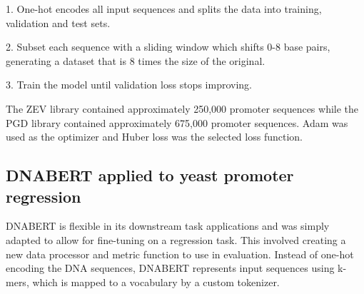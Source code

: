 \documentclass{article}
\begin{document}
1. One-hot encodes all input sequences and splits the data into training, validation and test sets.

2. Subset each sequence with a sliding window which shifts 0-8 base pairs, generating a dataset that is 8 times the size of the original.

3. Train the model until validation loss stops improving.

The ZEV library contained approximately 250,000 promoter sequences while the PGD library contained approximately 675,000 promoter sequences. Adam was used as the optimizer and Huber loss was the selected loss function. 

\subsection{DNABERT applied to yeast promoter regression}
DNABERT is flexible in its downstream task applications and was simply adapted to allow for fine-tuning on a regression task. This involved creating a new data processor and metric function to use in evaluation. Instead of one-hot encoding the DNA sequences, DNABERT represents input sequences using k-mers, which is mapped to a vocabulary by a custom tokenizer.

\printbibliography
\end{document}
